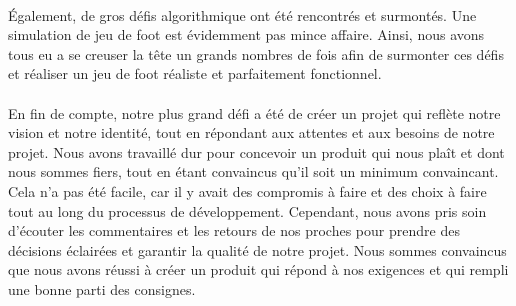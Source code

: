 \paragraph{}
    Également, de gros défis algorithmique ont été rencontrés et surmontés. Une simulation de jeu de foot est évidemment pas mince affaire. Ainsi, nous avons tous eu a se creuser la tête un grands nombres de fois afin de surmonter ces défis et réaliser un jeu de foot réaliste et parfaitement fonctionnel.
\paragraph{}
    En fin de compte, notre plus grand défi a été de créer un projet qui reflète notre vision et notre identité, tout en répondant aux attentes et aux besoins de notre projet. Nous avons travaillé dur pour concevoir un produit qui nous plaît et dont nous sommes fiers, tout en étant convaincus qu'il soit un minimum convaincant. Cela n'a pas été facile, car il y avait des compromis à faire et des choix à faire tout au long du processus de développement. Cependant, nous avons pris soin d'écouter les commentaires et les retours de nos proches pour prendre des décisions éclairées et garantir la qualité de notre projet. Nous sommes convaincus que nous avons réussi à créer un produit qui répond à nos exigences et qui rempli une bonne parti des consignes.